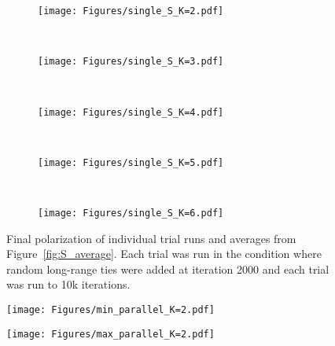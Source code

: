 \begin{figure}[h!]
  \centering
  \begin{subfigure}[t]{\textwidth}
    \centering
    \texttt{[image: Figures/single\_S\_K=2.pdf]}
  \end{subfigure} \\
  \begin{subfigure}[t]{0.49\textwidth}
      \centering
      \texttt{[image: Figures/single\_S\_K=3.pdf]}
  \end{subfigure}
  ~
  \begin{subfigure}[t]{0.49\textwidth}
      \centering
      \texttt{[image: Figures/single\_S\_K=4.pdf]}
  \end{subfigure} \\
  \begin{subfigure}[t]{0.49\textwidth}
      \centering
      \texttt{[image: Figures/single\_S\_K=5.pdf]}
  \end{subfigure}
  ~
  \begin{subfigure}[t]{0.49\textwidth}
      \centering
      \texttt{[image: Figures/single\_S\_K=6.pdf]}
  \end{subfigure}
  \caption{Final polarization of individual trial runs and averages from
    Figure~\ref{fig:S_average}. Each trial was run in the condition 
    where random long-range ties were added at iteration 2000 and each trial
    was run to 10k iterations.
  }
  \label{fig:single_S_K}
\end{figure}


\begin{figure}
  \centering
    \texttt{[image: Figures/min\_parallel\_K=2.pdf]}
  \caption{}
  \label{fig:}
\end{figure}

\begin{figure}
  \centering
    \texttt{[image: Figures/max\_parallel\_K=2.pdf]}
  \caption{}
  \label{fig:}
\end{figure}



